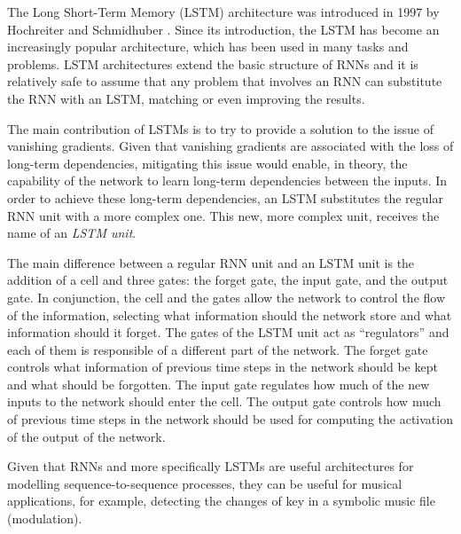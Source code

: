 The Long Short-Term Memory (LSTM) architecture was introduced in
1997 by Hochreiter and Schmidhuber
\parencite{hochreiter1997long}. Since its introduction, the
LSTM has become an increasingly popular architecture, which
has been used in many tasks and problems. LSTM architectures
extend the basic structure of RNNs and it is relatively safe
to assume that any problem that involves an RNN can
substitute the RNN with an LSTM, matching or even improving
the results.

The main contribution of LSTMs is to try to provide a
solution to the issue of vanishing gradients. Given that
vanishing gradients are associated with the loss of
long-term dependencies, mitigating this issue would enable,
in theory, the capability of the network to learn long-term
dependencies between the inputs. In order to achieve these
long-term dependencies, an LSTM substitutes the regular RNN
unit with a more complex one. This new, more complex unit,
receives the name of an \emph{LSTM unit}.

The main difference between a regular RNN unit and an LSTM
unit is the addition of a cell and three gates: the forget
gate, the input gate, and the output gate. In conjunction,
the cell and the gates allow the network to control the flow
of the information, selecting what information should the
network store and what information should it forget. The
gates of the LSTM unit act as ``regulators'' and each of
them is responsible of a different part of the network. The
forget gate controls what information of previous time steps
in the network should be kept and what should be forgotten.
The input gate regulates how much of the new inputs to the
network should enter the cell. The output gate controls how
much of previous time steps in the network should be used
for computing the activation of the output of the network.

Given that RNNs and more specifically LSTMs are useful
architectures for modelling sequence-to-sequence processes,
they can be useful for musical applications, for example,
detecting the changes of key in a symbolic music file
(modulation).



